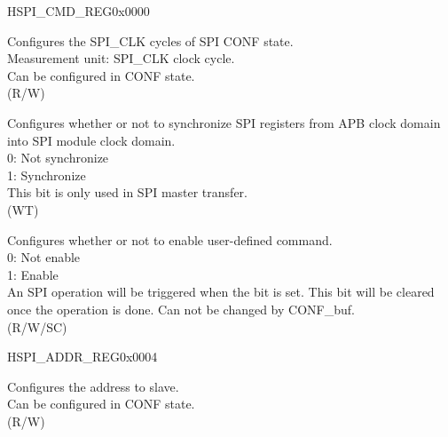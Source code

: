 \begin{register}{H}{SPI\_CMD\_REG}{0x0000}\label{regdesc:SPICMDREG}
%
%
%
%
%
\regnewline%
\begin{regdesc}\begin{reglist}
\label{fielddesc:SPICONFBITLEN}\item [SPI\_CONF\_BITLEN] Configures the SPI\_CLK cycles of SPI CONF state.\\
Measurement unit: SPI\_CLK clock cycle.\\
Can be configured in CONF state. \\(R/W)
\label{fielddesc:SPIUPDATE}\item [SPI\_UPDATE] Configures whether or not to synchronize SPI registers from APB clock domain into SPI module clock domain. \\
0: Not synchronize \\
1: Synchronize \\
This bit is only used in SPI master transfer. \\ (WT)
\label{fielddesc:SPIUSR}\item [SPI\_USR] Configures whether or not to enable user-defined command. \\
0: Not enable \\
1: Enable \\
An SPI operation will be triggered when the bit is set. This bit will be cleared once the operation is done. Can not be changed by CONF\_buf. \\ (R/W/SC)
\end{reglist}\end{regdesc}
\end{register}


\begin{register}{H}{SPI\_ADDR\_REG}{0x0004}\label{regdesc:SPIADDRREG}
%
\regnewline%
\begin{regdesc}\begin{reglist}
\label{fielddesc:SPIUSRADDRVALUE}\item [SPI\_USR\_ADDR\_VALUE] Configures the address to slave.\\
Can be configured in CONF state.\\ (R/W)
\end{reglist}\end{regdesc}
\end{register}


